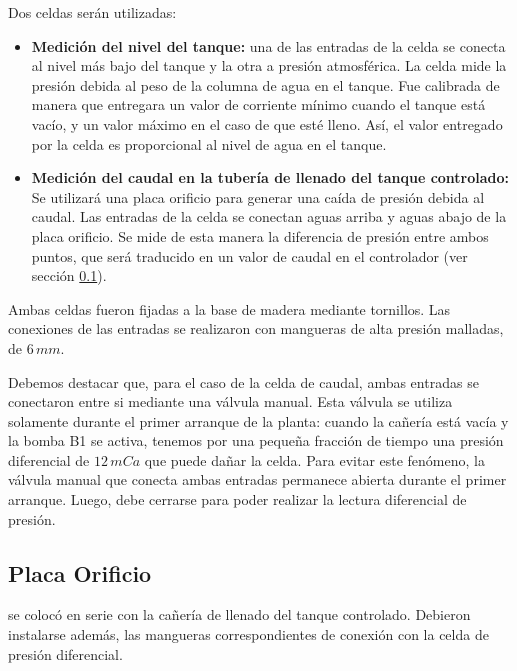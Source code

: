 Dos celdas serán utilizadas:
\begin{itemize}
 \item \textbf{Medición del nivel del tanque:} una de las entradas de la celda
se conecta  al nivel más bajo del tanque y la otra a presión atmosférica.
La celda mide la presión debida al peso  de la columna de agua en el tanque.
Fue calibrada de manera que entregara un valor de corriente mínimo
cuando el tanque está vacío, y un valor máximo en el caso de que esté
lleno.
Así, el valor entregado por la celda es proporcional al nivel de
agua en el tanque.

\item \textbf{Medición del caudal en la tubería de llenado del tanque
controlado:}
Se utilizará una placa orificio para generar una caída de presión debida al
caudal.
Las entradas de la celda se conectan aguas arriba y aguas abajo
de la placa orificio.
Se mide de esta manera la diferencia de presión entre ambos puntos, que será
traducido en un valor de caudal en el
controlador (ver sección \ref{subsec:PlacaOrificio}).
\end{itemize}

Ambas celdas fueron fijadas a la base de madera mediante tornillos.
Las conexiones de las entradas se realizaron con mangueras de alta presión
malladas, de $6\,mm$.

Debemos destacar que, para el caso de la celda de caudal, ambas
entradas se conectaron entre si mediante una válvula manual.
Esta válvula se utiliza solamente durante el primer arranque de la planta:
cuando la cañería está vacía y la bomba B1 se activa, tenemos por una pequeña
fracción de tiempo una presión diferencial de $12\,mCa$ que puede dañar la
celda.
Para evitar este fenómeno, la válvula manual que conecta ambas entradas
permanece abierta durante el primer arranque.
Luego, debe cerrarse para poder realizar la lectura diferencial de presión.

\subsection{Placa Orificio}
\label{subsec:PlacaOrificio}
  se colocó en serie con la cañería de llenado del tanque controlado.
  Debieron instalarse además, las mangueras correspondientes de conexión 
  con la celda de presión diferencial.

